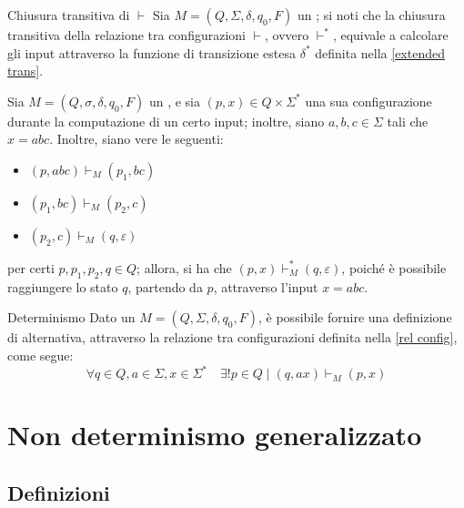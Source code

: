 \documentclass[a4paper, 12pt]{report}
\begin{document}
    \begin{framedobs}{Chiusura transitiva di $\vdash$}
        Sia $M = (Q, \Sigma, \delta, q_0, F)$ un \DFA; si noti che la chiusura transitiva della relazione tra configurazioni $\vdash$, ovvero $\vdash^*$, equivale a calcolare gli input attraverso la funzione di transizione estesa $\delta^*$ definita nella \cref{extended trans}.
    \end{framedobs}

    \begin{example}
        Sia $M = (Q, \sigma, \delta, q_0, F)$ un \DFA, e sia $(p, x) \in Q \times \Sigma ^*$ una sua configurazione durante la computazione di un certo input; inoltre, siano $a, b, c \in \Sigma$ tali che $x = abc$. Inoltre, siano vere le seguenti:

        \begin{itemize}
            \item $(p, abc) \vdash_M (p_1, bc)$
            \item $(p_1, bc) \vdash_M (p_2, c)$
            \item $(p_2, c) \vdash_M (q, \varepsilon)$
        \end{itemize}

        per certi $p, p_1, p_2, q \in Q$; allora, si ha che $(p, x) \vdash_M^* (q, \varepsilon)$, poiché è possibile raggiungere lo stato $q$, partendo da $p$, attraverso l'input $x = abc$.
    \end{example}

    \begin{framedobs}{Determinismo}
        Dato un \DFA $M = (Q, \Sigma, \delta, q_0, F)$, è possibile fornire una definizione di  alternativa, attraverso la relazione tra configurazioni definita nella \cref{rel config}, come segue: $$\forall q \in Q, a \in \Sigma, x \in \Sigma ^* \quad \exists ! p \in Q \mid (q, ax) \vdash_M (p, x)$$
    \end{framedobs}

    \section{Non determinismo generalizzato}

    \subsection{Definizioni}
    
\end{document}
